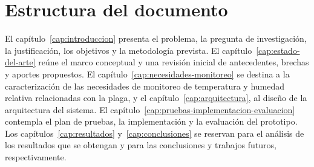 \section{Estructura del documento}
\label{sec:estructura}

El capítulo~\ref{cap:introduccion} presenta el problema, la pregunta de
investigación, la justificación, los objetivos y la metodología prevista.
El capítulo~\ref{cap:estado-del-arte} reúne el marco conceptual y una revisión
inicial de antecedentes, brechas y aportes propuestos. El
capítulo~\ref{cap:necesidades-monitoreo} se destina a la caracterización de las
necesidades de monitoreo de temperatura y humedad relativa relacionadas con
la plaga, y el capítulo~\ref{cap:arquitectura}, al diseño de la arquitectura del
sistema. El capítulo~\ref{cap:pruebas-implementacion-evaluacion} contempla el
plan de pruebas, la implementación y la evaluación del prototipo. Los
capítulos~\ref{cap:resultados} y~\ref{cap:conclusiones} se reservan para el
análisis de los resultados que se obtengan y para las conclusiones y trabajos
futuros, respectivamente.
